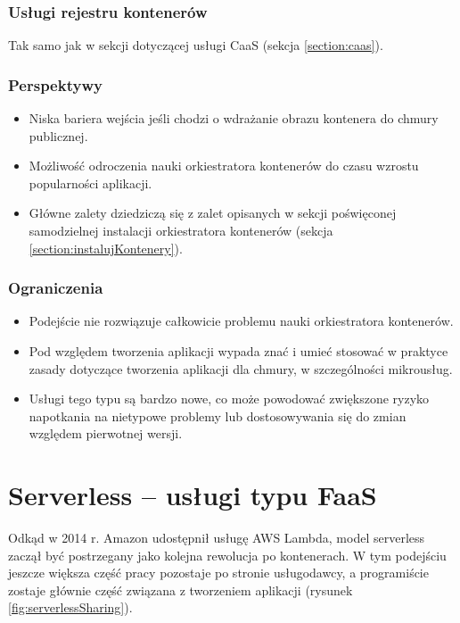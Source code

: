 \documentclass[12pt,a4paper,twoside,titlepage,openright]{book}
\begin{document}
\subsubsection{Usługi rejestru kontenerów}
Tak samo jak w sekcji dotyczącej usługi CaaS (sekcja \ref{section:caas}).

\subsubsection{Perspektywy}
\begin{itemize}
\item Niska bariera wejścia jeśli chodzi o wdrażanie obrazu kontenera do chmury publicznej.
\item Możliwość odroczenia nauki orkiestratora kontenerów do czasu wzrostu popularności aplikacji.
\item Główne zalety dziedziczą się z zalet opisanych w sekcji poświęconej samodzielnej instalacji orkiestratora kontenerów (sekcja \ref{section:instalujKontenery}).
\end{itemize}

\subsubsection{Ograniczenia}
\begin{itemize}
\item Podejście nie rozwiązuje całkowicie problemu nauki orkiestratora kontenerów.
\item Pod względem tworzenia aplikacji wypada znać i umieć stosować w praktyce zasady dotyczące tworzenia aplikacji dla chmury, w szczególności mikrousług.
\item Usługi tego typu są bardzo nowe, co może powodować zwiększone ryzyko napotkania na nietypowe problemy lub dostosowywania się do zmian względem pierwotnej wersji.
\end{itemize}

\section{Serverless -- usługi typu FaaS} \label{section:podejscieServerless}

Odkąd w 2014 r. Amazon udostępnił usługę AWS Lambda, model serverless zaczął być postrzegany jako kolejna rewolucja po kontenerach. W tym podejściu jeszcze większa część pracy pozostaje po stronie usługodawcy, a programiście zostaje głównie część związana z tworzeniem aplikacji (rysunek \ref{fig:serverlessSharing}).
\end{document}
